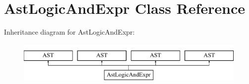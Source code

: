 \hypertarget{classAstLogicAndExpr}{\section{Ast\-Logic\-And\-Expr Class Reference}
\label{classAstLogicAndExpr}
}
Inheritance diagram for Ast\-Logic\-And\-Expr\-:\begin{figure}[H]
\begin{center}
\leavevmode
\includegraphics[height=2.000000cm]{classAstLogicAndExpr}
\end{center}
\end{figure}
